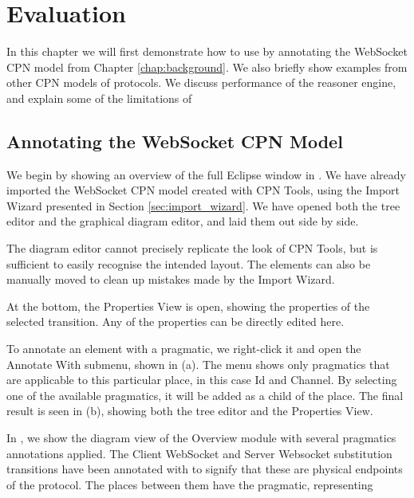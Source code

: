 \chapter{Evaluation}
\label{chap:evaluation}

In this chapter we will first demonstrate how to use \thename{} by annotating
the WebSocket CPN model from Chapter \ref{chap:background}. We also briefly
show examples from other CPN models of protocols.
We discuss performance of the reasoner engine, and explain some of the
limitations of \thename{}

\section{Annotating the WebSocket CPN Model}
We begin by showing an overview of the full Eclipse window in
. We have already imported the WebSocket CPN model created
with CPN Tools, using the Import Wizard presented in Section
\ref{sec:import_wizard}. We have opened both the tree editor and the
graphical diagram editor, and laid them out side by side. 


The diagram editor cannot precisely replicate the look of CPN Tools, but is
sufficient to easily recognise the intended layout. The elements can also be
manually moved to clean up mistakes made by the Import Wizard. 

At the bottom, the Properties View is open, showing the properties of the
selected transition. Any of the properties can be directly edited here.

To annotate an element with a pragmatic, we right-click it and open the Annotate
With submenu, shown in  (a). The menu shows only
pragmatics that are applicable to this particular place, in this case Id and
Channel. By selecting one of the available pragmatics, it will be added as a
child of the place. The final result is seen in  (b),
showing both the tree editor and the Properties View.


In , we show the diagram view of the Overview module
with several pragmatics annotations applied. The Client WebSocket and Server
Websocket substitution transitions have been annotated with 
to signify that these are physical endpoints of the protocol. The places between
them have the  pragmatic, representing 

